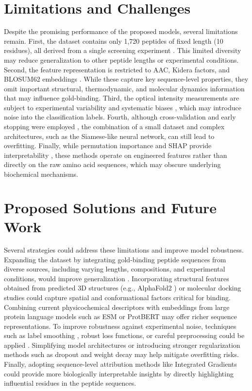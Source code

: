 \documentclass{article}
\begin{document}
\section{Limitations and Challenges}
Despite the promising performance of the proposed models, several limitations remain.  
First, the dataset contains only 1,720 peptides of fixed length (10 residues), all derived from a single screening experiment \cite{tanaka2017,janairo2022a}. This limited diversity may reduce generalization to other peptide lengths or experimental conditions.  
Second, the feature representation is restricted to AAC, Kidera factors, and BLOSUM62 embeddings \cite{kidera1985,henikoff1992}. While these capture key sequence-level properties, they omit important structural, thermodynamic, and molecular dynamics information that may influence gold-binding.  
Third, the optical intensity measurements are subject to experimental variability and systematic biases \cite{tanaka2017}, which may introduce noise into the classification labels.  
Fourth, although cross-validation and early stopping were employed \cite{bergstra2012,prechelt1998}, the combination of a small dataset and complex architectures, such as the Siamese-like neural network, can still lead to overfitting.  
Finally, while permutation importance and SHAP provide interpretability \cite{lundberg2017unified}, these methods operate on engineered features rather than directly on the raw amino acid sequences, which may obscure underlying biochemical mechanisms.

\section{Proposed Solutions and Future Work}
Several strategies could address these limitations and improve model robustness.  
Expanding the dataset by integrating gold-binding peptide sequences from diverse sources, including varying lengths, compositions, and experimental conditions, would improve generalization \cite{zhang2022protein}.  
Incorporating structural features obtained from predicted 3D structures (e.g., AlphaFold2 \cite{jumper2021highly}) or molecular docking studies could capture spatial and conformational factors critical for binding.  
Combining current physicochemical descriptors with embeddings from large protein language models such as ESM \cite{rao2021transformer} or ProtBERT \cite{elnaggar2021prottrans} may offer richer sequence representations.  
To improve robustness against experimental noise, techniques such as label smoothing \cite{Szegedy2016LabelSmoothing}, robust loss functions, or careful preprocessing could be applied \cite{szegedy2016rethinking}.  
Simplifying model architectures or introducing stronger regularization methods such as dropout \cite{Krogh1992Dropout} and weight decay \cite{krogh1992simple} may help mitigate overfitting risks.  
Finally, adopting sequence-level attribution methods like Integrated Gradients \cite{Sundararajan2017IntegratedGradients} could provide more biologically interpretable insights by directly highlighting influential residues in the peptide sequences.
\end{document}
